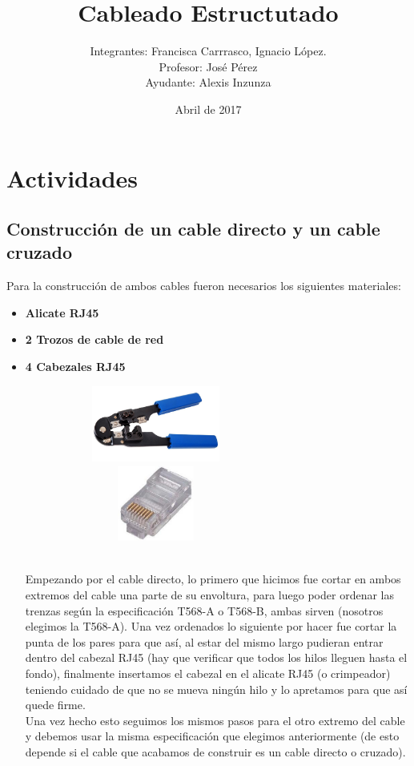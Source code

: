 \documentclass{udpreport}
\title{Cableado Estructutado}
\author{Integrantes: Francisca Carrrasco, Ignacio López.\\Profesor: José Pérez
\\Ayudante: Alexis Inzunza}
\date{Abril de 2017}
\begin{document}
\maketitle
\tableofcontents
\chapter{Actividades}
	\section{Construcción de un cable directo y un cable cruzado}
	    Para la construcción de ambos cables fueron necesarios los siguientes materiales: 
\begin{itemize}
		\item{\bf Alicate RJ45}
		\item{\bf 2 Trozos de cable de red}
		\item{\bf 4 Cabezales RJ45}
		\begin{figure}[h]
		    \centering
    	\includegraphics[width=6.5cm, height=2.5cm]{alicate.jpg}
    	\includegraphics[width=6.5cm, height=2.5cm]{cabezal.jpeg}
    	\end{figure}
    	\\Empezando por el cable directo, lo primero que hicimos fue cortar en ambos extremos del cable una parte de su envoltura, para luego poder ordenar las trenzas según la especificación T568-A o T568-B, ambas sirven (nosotros elegimos la T568-A). Una vez ordenados lo siguiente por hacer fue cortar la punta de los pares para que así, al estar del mismo largo pudieran entrar dentro del cabezal RJ45 (hay que verificar que todos los hilos lleguen hasta el fondo), finalmente insertamos el cabezal en el alicate RJ45 (o crimpeador) teniendo cuidado de que no se mueva ningún hilo y lo apretamos para que así quede firme.
    	\\Una vez hecho esto seguimos los mismos pasos para el otro extremo del cable y debemos usar la misma especificación que elegimos anteriormente (de esto depende si el cable que acabamos de construir es un cable directo o cruzado).

\end{itemize}
\end{document}
